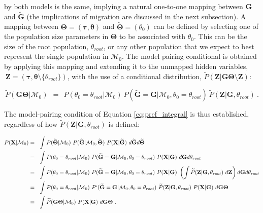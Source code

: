 \documentclass[11pt]{article}
\newcommand{\vect}[1]{\boldsymbol{\mathbf{#1}}}
\newcommand{\X}{\vect{X}}
\newcommand{\M}{\mathcal{M}}
\newcommand{\G}{\vect{G}}
\newcommand{\T}{\vect{\Theta}}
\newcommand{\GT}{\G\T}
\newcommand{\Pref}{\widetilde{P}}
\newcommand{\Gref}{\widetilde{\G}}
\newcommand{\Tref}{\widetilde{\T}}
\newcommand{\1}{\mathbbm{1}}
\newcommand{\Z}{\vect{Z}}
\newcommand{\troot}{\theta_{root}}
\newcommand{\taus}{\vect\tau}
\newcommand{\thetas}{\vect\theta}
\begin{document}
by both models is the same, implying a natural one-to-one mapping between $\G$ and $\Gref$ (the implications of migration are discussed in the next subsection).
%
A mapping between $\T=(\taus,\thetas)$ and $\Tref=(\theta_0)$ can be defined by selecting one of the population size parameters in $\T$
to be associated with $\theta_0$. This can be the size of the root population, $\troot$, or any other population
that we expect to best represent the single population in $\M_0$.
%
The model pairing conditional is obtained by applying this mapping and extending it to the unmapped hidden variables, $~ \Z=(\taus,\thetas\setminus \{\troot\})$, with the use of a conditional distribution, $\Pref(\Z|\GT\setminus\Z)$:
%
%
\begin{small}
\begin{equation}
 \Pref(\GT|\M_0)  ~~=~~
 P(\theta_0=\troot|\M_0)\ P(\Gref=\G|\M_0,\theta_0=\troot)\ \Pref(\Z|\G,\troot)   ~ .\label{eq:pref_null}
\end{equation}
\end{small}
%
%
The model-pairing condition of Equation \ref{eq:pref_integral} is thus established, regardless of how $\Pref(\Z|\G,\troot)$ is defined:
%
%
\begin{small}
\begin{align}
P(\X|\M_0)
&=~~ \int P(\Tref|\M_0)\ P(\Gref|\M_0,\Tref)\ P(\X|\Gref)\   d\Gref d\Tref  \notag \\ %
&=~~ \int P(\theta_0=\troot|\M_0)\ P(\Gref=\G|\M_0,\theta_0=\troot)\ P(\X|\G)\  d\G d\troot \notag \\ 
&=~~ \int P(\theta_0=\troot|\M_0)\ P(\Gref=\G|\M_0,\theta_0=\troot)\ P(\X|\G)\
\left( \int \Pref(\Z|\G,\troot)\ d\Z \right) d\G d\troot \notag \\ 
%
&=~~ \int P(\theta_0=\troot|\M_0)\ P`(\Gref=\G|\M_0,\theta_0=\troot)\ \Pref(\Z|\G,\troot)\ P(\X|\G)\ d\GT \notag \\ 
&=~~ \int \Pref(\GT|\M_0)\ P(\X|\G)\ d\GT ~. \label{eq:likelihood_null} %
\end{align}
\end{small}
\end{document}
